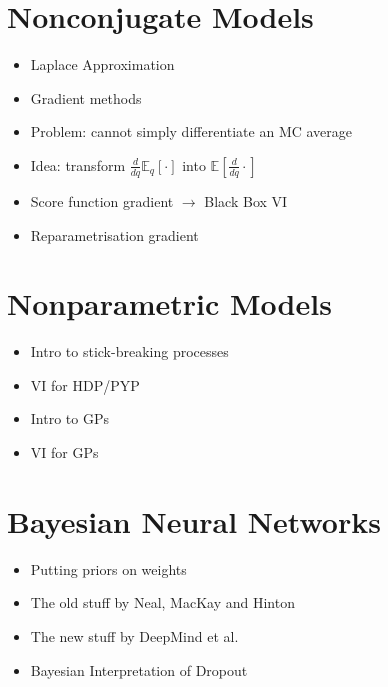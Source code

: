 \documentclass[11pt, a4paper]{article}
\begin{document}
\section{Nonconjugate Models}
\begin{itemize}
\item Laplace Approximation %
\item Gradient methods
\item Problem: cannot simply differentiate an MC average
\item Idea: transform $ \frac{d}{dq} \mathbb{E}_{q}[\cdot] $ into $ \mathbb{E}[\frac{d}{dq}\cdot] $
\item Score function gradient $ \rightarrow $ Black Box VI \citep{PaisleyEtAl:2012, RanganathEtAl:2014}
\item Reparametrisation gradient \citep{KingmaWelling:2013, RezendeEtAl:2014, TitsiasLazarogredilla:2014}
\end{itemize}

\section{Nonparametric Models}


\begin{itemize}
\item Intro to stick-breaking processes \citep{IshwaranJames:2001}
\item VI for HDP/PYP \citep{WangEtAl:2011}
\item Intro to GPs
\item VI for GPs
\end{itemize}

\section{Bayesian Neural Networks}
\begin{itemize}
\item Putting priors on weights
\item The old stuff by Neal, MacKay and Hinton \citep{HintonVancamp:1993}
\item The new stuff by DeepMind et al. \citep{Graves:2011, BlundellEtAl:2015}
\item Bayesian Interpretation of Dropout \citep{Gal:2016}
\end{itemize}
\end{document}
